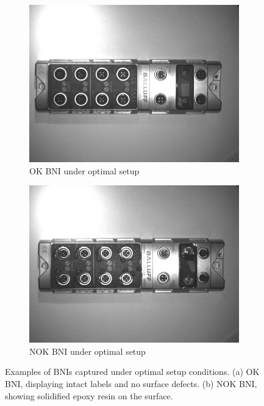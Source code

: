 \documentclass[12pt,DIV14,BCOR12mm,a4paper,footinclude=false,headinclude,parskip=half-,twoside,openright,cleardoublepage=empty,toc=index,bibliography=totoc,listof=totoc]{scrreprt}
\numberwithin{equation}{chapter}
\begin{document}
\begin{figure}
    \centering
    \begin{subfigure}[b]{0.45\textwidth}
        \centering
        \includegraphics[scale=0.15]{../media/BNI-optimal-OK.png}
        \caption{OK BNI under optimal setup}
        \label{fig:bni_ok}
    \end{subfigure}
    \hfill
    \begin{subfigure}[b]{0.45\textwidth}
        \centering
        \includegraphics[scale=0.15]{../media/BNI-optimal-NOK.png}
        \caption{NOK BNI under optimal setup}
        \label{fig:bni_nok}
    \end{subfigure}
    \caption{Examples of BNIs captured under optimal setup conditions. (a) OK BNI, displaying intact labels and no surface defects. (b) NOK BNI, showing solidified epoxy resin on the surface.}
    \label{fig:optimal_setup_bnis}
\end{figure}
\end{document}
